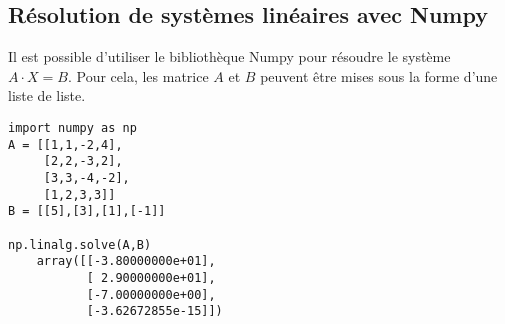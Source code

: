 
\subsection{Résolution de systèmes linéaires avec Numpy}
Il est possible d'utiliser le bibliothèque Numpy pour résoudre le système $A\cdot X = B$. 
Pour cela, les matrice $A$ et $B$ peuvent être mises sous la forme d'une liste de liste. 

\begin{lstlisting}
import numpy as np
A = [[1,1,-2,4],
     [2,2,-3,2],
     [3,3,-4,-2],
     [1,2,3,3]]
B = [[5],[3],[1],[-1]]

np.linalg.solve(A,B)
	array([[-3.80000000e+01],
	       [ 2.90000000e+01],
	       [-7.00000000e+00],
	       [-3.62672855e-15]])
\end{lstlisting}
